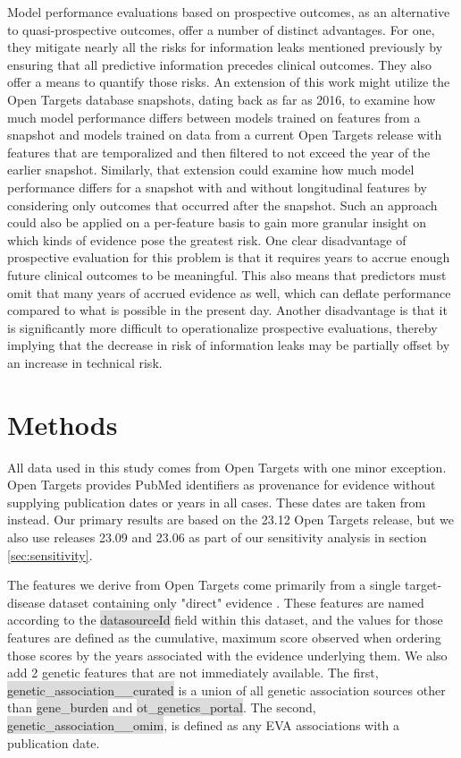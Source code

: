 \documentclass{article}
\begin{document}
Model performance evaluations based on prospective outcomes, as an alternative to quasi-prospective outcomes, offer a number of distinct advantages. For one, they mitigate nearly all the risks for information leaks mentioned previously by ensuring that all predictive information precedes clinical outcomes. They also offer a means to quantify those risks. An extension of this work might utilize the Open Targets database snapshots, dating back as far as 2016, to examine how much model performance differs between models trained on features from a snapshot and models trained on data from a current Open Targets release with features that are temporalized and then filtered to not exceed the year of the earlier snapshot. Similarly, that extension could examine how much model performance differs for a snapshot with and without longitudinal features by considering only outcomes that occurred after the snapshot. Such an approach could also be applied on a per-feature basis to gain more granular insight on which kinds of evidence pose the greatest risk. One clear disadvantage of prospective evaluation for this problem is that it requires years to accrue enough future clinical outcomes to be meaningful. This also means that predictors must omit that many years of accrued evidence as well, which can deflate performance compared to what is possible in the present day. Another disadvantage is that it is significantly more difficult to operationalize prospective evaluations, thereby implying that the decrease in risk of information leaks may be partially offset by an increase in technical risk.

\section{Methods}
\label{sec:methods}

All data used in this study comes from Open Targets with one minor exception. Open Targets provides PubMed identifiers as provenance for evidence without supplying publication dates or years in all cases. These dates are taken from \cite{PMID:33763309} instead. Our primary results are based on the 23.12 Open Targets release, but we also use releases 23.09 and 23.06 as part of our sensitivity analysis in section \ref{sec:sensitivity}. 

The features we derive from Open Targets come primarily from a single target-disease dataset containing only "direct" evidence \cite{OTdirectVsIndirect}. These features are named according to the \colorbox{Gainsboro}{datasourceId} field within this dataset, and the values for those features are defined as the cumulative, maximum score observed when ordering those scores by the years associated with the evidence underlying them. We also add 2 genetic features that are not immediately available. The first, \colorbox{Gainsboro}{genetic\_association\_\_curated} is a union of all genetic association sources other than \colorbox{Gainsboro}{gene\_burden} and \colorbox{Gainsboro}{ot\_genetics\_portal}. The second, \colorbox{Gainsboro}{genetic\_association\_\_omim}, is defined as any EVA associations with a publication date.
\end{document}
